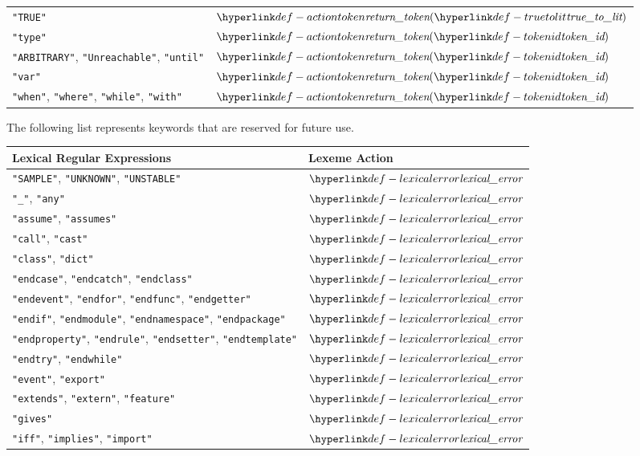 \begin{center}
\begin{tabular}{ll}
\texttt{"TRUE"}          & $\actiontoken(\truetolit)$ \\
\texttt{"type"}          & $\actiontoken(\tokenid)$ \\
\texttt{"ARBITRARY"}, \texttt{"Unreachable"}, \texttt{"until"}         & $\actiontoken(\tokenid)$ \\
\texttt{"var"}           & $\actiontoken(\tokenid)$ \\
\texttt{"when"}, \texttt{"where"}, \texttt{"while"}, \texttt{"with"}          & $\actiontoken(\tokenid)$ \\
\hline
\end{tabular}
\end{center}

The following list represents keywords that are reserved for future use.
\begin{center}
\begin{tabular}{ll}
\textbf{Lexical Regular Expressions} & \textbf{Lexeme Action}\\
\hline
\texttt{"SAMPLE"}, \texttt{"UNKNOWN"}, \texttt{"UNSTABLE"} & $\lexicalerror$ \\
\texttt{"\_"}, \texttt{"any"} & $\lexicalerror$ \\
\texttt{"assume"}, \texttt{"assumes"} & $\lexicalerror$ \\
\texttt{"call"}, \texttt{"cast"} & $\lexicalerror$ \\
\texttt{"class"}, \texttt{"dict"} & $\lexicalerror$ \\
\texttt{"endcase"}, \texttt{"endcatch"}, \texttt{"endclass"} & $\lexicalerror$ \\
\texttt{"endevent"}, \texttt{"endfor"}, \texttt{"endfunc"}, \texttt{"endgetter"} & $\lexicalerror$ \\
\texttt{"endif"}, \texttt{"endmodule"}, \texttt{"endnamespace"}, \texttt{"endpackage"} & $\lexicalerror$ \\
\texttt{"endproperty"}, \texttt{"endrule"}, \texttt{"endsetter"}, \texttt{"endtemplate"} & $\lexicalerror$ \\
\texttt{"endtry"}, \texttt{"endwhile"} & $\lexicalerror$ \\
\texttt{"event"}, \texttt{"export"} & $\lexicalerror$ \\
\texttt{"extends"}, \texttt{"extern"}, \texttt{"feature"} & $\lexicalerror$ \\
\texttt{"gives"} & $\lexicalerror$ \\
\texttt{"iff"}, \texttt{"implies"}, \texttt{"import"} & $\lexicalerror$ \\

\end{tabular}
\end{center}
